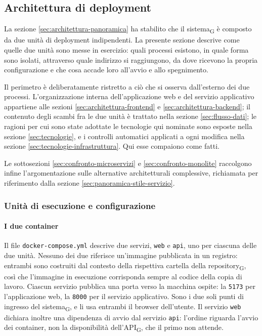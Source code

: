 \documentclass[a4paper, 10pt]{article}
\begin{document}
\subsection{Architettura di deployment}
\label{sec:architettura-deployment}
La sezione \ref{sec:architettura-panoramica} ha stabilito che il sistema\textsubscript{G} è composto da due unità di deployment indipendenti. La presente sezione descrive come quelle due unità sono messe in esercizio: quali processi esistono, in quale forma sono isolati, attraverso quale indirizzo si raggiungono, da dove ricevono la propria configurazione e che cosa accade loro all'avvio e allo spegnimento.

Il perimetro è deliberatamente ristretto a ciò che si osserva dall'esterno dei due processi. L'organizzazione interna dell'applicazione web e del servizio applicativo appartiene alle sezioni \ref{sec:architettura-frontend} e \ref{sec:architettura-backend}; il contenuto degli scambi fra le due unità è trattato nella sezione \ref{sec:flusso-dati}; le ragioni per cui sono state adottate le tecnologie qui nominate sono esposte nella sezione \ref{sec:tecnologie}, e i controlli automatici applicati a ogni modifica nella sezione \ref{sec:tecnologie-infrastruttura}. Qui esse compaiono come fatti.

Le sottosezioni \ref{sec:confronto-microservizi} e \ref{sec:confronto-monolite} raccolgono infine l'argomentazione sulle alternative architetturali complessive, richiamata per riferimento dalla sezione \ref{sec:panoramica-stile-servizio}.

\subsubsection{Unità di esecuzione e configurazione}
\label{sec:deployment-unita}

\paragraph{I due container}
Il file \texttt{docker-compose.yml} descrive due servizi, \texttt{web} e \texttt{api}, uno per ciascuna delle due unità. Nessuno dei due riferisce un'immagine pubblicata in un registro: entrambi sono costruiti dal contesto della rispettiva cartella della repository\textsubscript{G}, così che l'immagine in esecuzione corrisponda sempre al codice della copia di lavoro. Ciascun servizio pubblica una porta verso la macchina ospite: la \texttt{5173} per l'applicazione web, la \texttt{8000} per il servizio applicativo. Sono i due soli punti di ingresso del sistema\textsubscript{G}, e li usa entrambi il browser dell'utente. Il servizio \texttt{web} dichiara inoltre una dipendenza di avvio dal servizio \texttt{api}: l'ordine riguarda l'avvio dei container, non la disponibilità dell'API\textsubscript{G}, che il primo non attende.
\end{document}
